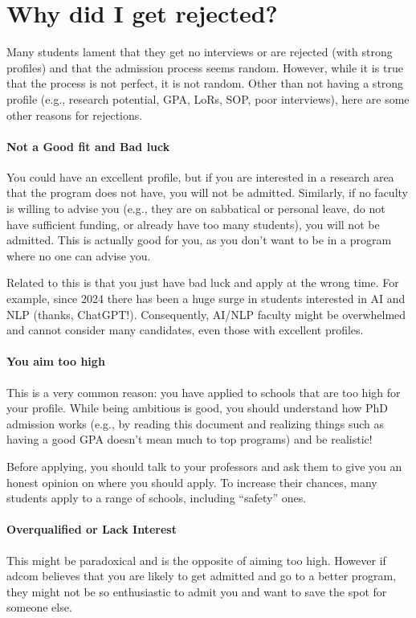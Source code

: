 \documentclass[oneside,11pt,dvipsnames]{book}
\begin{document}
\section{Why did I get rejected?}\label{sec:why-rejected}

Many students lament that they get no interviews or are rejected (with strong profiles) and that the admission process seems random.  However, while it is true that the process is not perfect, it is not random.
Other than not having a strong profile (e.g., research potential, GPA, LoRs, SOP, poor interviews), here are some other reasons for rejections.


\paragraph{Not a Good fit and Bad luck}  You could have an excellent profile, but if you are interested in a research area that the program does not have, you will not be admitted.
Similarly, if no faculty is willing to advise you (e.g., they are on sabbatical or personal leave, do not have sufficient funding, or already have too many students), you will not be admitted.  This is actually good for you, as you don't want to be in a program where no one can advise you.

Related to this is that you just have bad luck and apply at the wrong time.  For example, since 2024 there has been a huge surge in students interested in AI and NLP (thanks, ChatGPT!). Consequently, AI/NLP faculty might be overwhelmed and cannot consider many candidates, even those with excellent profiles.


\paragraph{You aim too high} This is a very common reason: you have applied to schools that are too high for your profile. While being ambitious is good, you should understand how PhD admission works (e.g., by reading this document and realizing things such as having a good GPA doesn't mean much to top programs) and be realistic! 

Before applying, you should talk to your professors and ask them to give you an honest opinion on where you should apply. To increase their chances, many students apply to a range of schools, including ``safety'' ones. 


\paragraph{Overqualified or Lack Interest}  This might be paradoxical and is the opposite of aiming too high. However if adcom believes that you are likely to get admitted and go to a better program, they might not be so enthusiastic to admit you and want to save the spot for someone else.
\end{document}
